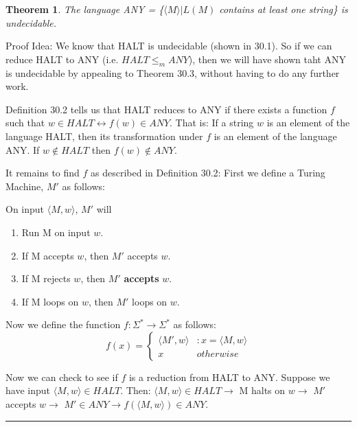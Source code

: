 \documentclass[twoside]{article}
\newcounter{lecnum}
\newtheorem{theorem}{Theorem}[lecnum]
\newenvironment{proof}{{\bf Proof:}}{\hfill\rule{2mm}{2mm}}
\begin{document}
\begin{theorem}
The language ANY = \{$\langle M \rangle | L(M)$ contains at least one string\} is undecidable.
\end{theorem}
Proof Idea: We know that HALT is undecidable (shown in 30.1). So if we can reduce HALT to ANY (i.e. $HALT \leq_m ANY$), then we will have shown taht ANY is undecidable by appealing to Theorem 30.3, without having to do any further work.\newline

\begin{proof}
Definition 30.2 tells us that HALT reduces to ANY if there exists a function $f$ such that $w \in HALT \leftrightarrow f(w) \in ANY$. That is: \newline
 If a string $w$ is an element of the language HALT, then its transformation under $f$ is an element of the language ANY. If $w \notin HALT$ then $f(w) \notin ANY$.\newline
 
 It remains to find $f$ as described in Definition 30.2:\newline
 First we define a Turing Machine, $M'$ as follows:\newline
 
 \hspace{1cm} On input $\langle M, w \rangle$, $M'$ will
 \begin{enumerate}
 \item Run M on input $w$.
 \item If M accepts $w$, then $M'$ accepts $w$.
 \item If M rejects $w$, then $M'$ \textbf{accepts} $w$.
 \item If M loops on $w$, then $M'$ loops on $w$.
 \end{enumerate}
 Now we define the function $f: \Sigma^* \rightarrow \Sigma^*$ as follows:\newline
 \begin{displaymath}
   f(x) = \left\{
     \begin{array}{lr}
       \langle M', w \rangle & : x = \langle M, w \rangle\\
       x &  otherwise
     \end{array}
   \right.
\end{displaymath}
 
 Now we can check to see if $f$ is a reduction from HALT to ANY.\newline
 Suppose we have input $\langle M, w \rangle \in HALT$. Then:\newline
 $\langle M, w \rangle \in HALT \rightarrow$ M halts on $w \rightarrow$ $M'$ accepts $w \rightarrow$ $M' \in ANY \rightarrow f(\langle M, w \rangle) \in ANY$.\newline
 

\end{proof}
\end{document}
